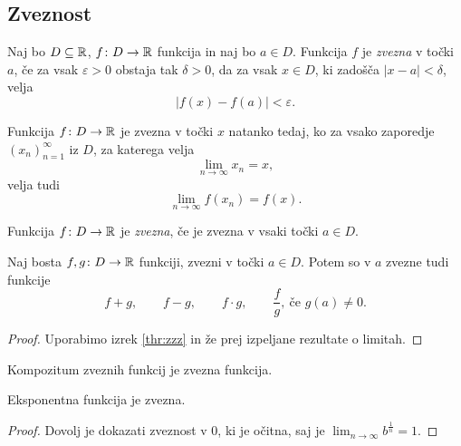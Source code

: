 \documentclass[12pt, a4paper]{article}
\begin{document}
\newpage

\subsection{Zveznost}

\begin{okvir}
\begin{definicija}
Naj bo $D\subseteq\mathbb{R}$, $f\colon D\to\mathbb{R}$ funkcija in naj bo $a\in D$. Funkcija $f$ je \emph{zvezna} v točki $a$, če za vsak $\varepsilon>0$ obstaja tak $\delta>0$, da za vsak $x\in D$, ki zadošča $|x-a|<\delta$, velja
\[
|f(x)-f(a)|<\varepsilon.
\]
\end{definicija}
\end{okvir}

\begin{izrek}\label{thr:zzz}
Funkcija $f\colon D\to\mathbb{R}$ je zvezna v točki $x$ natanko tedaj, ko za vsako zaporedje $(x_n)_{n=1}^\infty$ iz $D$, za katerega velja
\[
\lim_{n\to\infty}x_n=x,
\]
velja tudi
\[
\lim_{n\to\infty}f(x_n)=f(x).
\]
\end{izrek}

\obvs

\begin{definicija}
Funkcija $f\colon D\to\mathbb{R}$ je \emph{zvezna}, če je zvezna v vsaki točki $a\in D$.
\end{definicija}

\begin{izrek}
Naj bosta $f,g\colon D\to\mathbb{R}$ funkciji, zvezni v točki $a\in D$. Potem so v $a$ zvezne tudi funkcije
\[
f+g,\qquad f-g,\qquad f\cdot g,\qquad \frac{f}{g},~\text{če $g(a)\ne 0$}.
\]
\end{izrek}

\begin{proof}
Uporabimo izrek \ref{thr:zzz} in že prej izpeljane rezultate o limitah.
\end{proof}

\begin{izrek}
Kompozitum zveznih funkcij je zvezna funkcija.
\end{izrek}

\obvs

\begin{opomba}
Eksponentna funkcija je zvezna.
\end{opomba}

\begin{proof}
Dovolj je dokazati zveznost v $0$, ki je očitna, saj je $\displaystyle\lim_{n\to\infty}b^{\frac{1}{n}}=1$.
\end{proof}
\end{document}
